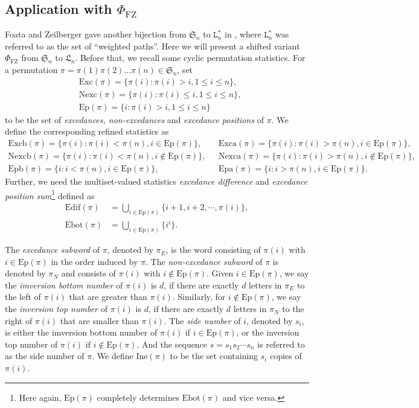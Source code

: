 \documentclass[12pt]{amsart}
\numberwithin{equation}{section}
\theoremstyle{plain}
\theoremstyle{definition}
\def\FZ{\mathrm{FZ}}
\def\SS{\mathfrak{S}}
\def\LH{\mathfrak{L}}
\def\Edif{\mathrm{Edif}}
\def\Excp{\mathrm{Ep}}
\def\Exc{\mathrm{Exc}}
\def\Nexc{\mathrm{Nexc}}
\def\Excpb{\mathrm{Epb}}
\def\Excpa{\mathrm{Epa}}
\def\Nexcb{\mathrm{Nexcb}}
\def\Nexca{\mathrm{Nexca}}
\def\Excb{\mathrm{Excb}}
\def\Exca{\mathrm{Exca}}
\def\Ine{\mathrm{Ine}}
\def\Ebot{\mathrm{Ebot}}
\begin{document}
\subsection{Application with \texorpdfstring{$\Phi_{\FZ}$}{Foata-Zeilberger's bijection}}\label{subsec:FZ}

Foata and Zeilberger gave another bijection
from $\SS_n$ to $\mathtt{L}_n^*$ in \cite{FZ90}, where $\mathtt{L}_n^*$ was referred to as the set of ``weighted paths''. Here we will present a shifted variant $\Phi_{\FZ}$ from $\SS_n$ to $\LH_n$.
Before that, we recall some cyclic permutation statistics. For a permutation
$\pi=\pi(1)\pi(2)\ldots \pi(n) \in \SS_n$, set
\begin{align*}
   &\Exc(\pi) =\{\pi(i) : \pi(i) > i, 1 \leq i \leq n\},  \\[3pt]
  &\Nexc(\pi) =\{\pi(i) : \pi(i) \leq i, 1 \leq i \leq n\},  \\[3pt]
   &\Excp(\pi)  =\{i: \pi(i) > i, 1 \leq i \leq n\}
\end{align*}
to be the set of {\em excedances, non-excedances} and {\em excedance positions} of $\pi$. We define the corresponding refined statistics as
\begin{align*}
  \Excb(\pi)=\{\pi(i) : \pi(i) <\pi(n), i \in \Excp(\pi)\}, &\,\,\,\, \Exca(\pi)=\{\pi(i) : \pi(i) >\pi(n), i \in \Excp(\pi)\}, \\[3pt]
  \Nexcb(\pi)=\{\pi(i) : \pi(i)<\pi(n), i \notin \Excp(\pi)\}, & \,\,\,\,\Nexca(\pi)=\{\pi(i) : \pi(i) >\pi(n), i \notin \Excp(\pi)\}, \\[3pt]
  \Excpb(\pi)=\{i : i <\pi(n), i \in \Excp(\pi)\}, &\,\,\,\, \Excpa(\pi)=\{i : i >\pi(n), i \in \Excp(\pi)\}.
\end{align*}
Further, we need the multiset-valued statistics {\em excedance difference} and {\em excedance position sum}\footnote{Here again, $\Excp(\pi)$ completely determines $\Ebot(\pi)$ and vice versa.} defined as
\begin{align*}
\Edif(\pi) &=\bigcup_{i \in \Excp(\pi)}\{i+1,i+2, \cdots, \pi(i)\},\\
\Ebot(\pi) &=\bigcup_{i \in \Excp(\pi)}\{i^{i}\}.
\end{align*}

The {\em excedance subword} of $\pi$, denoted by $\pi_E$,
is the word consisting of $\pi(i)$ with $i \in \Excp(\pi)$ in the order
induced by $\pi$. The {\em non-excedance subword} of $\pi$ is denoted
by $\pi_N$ and consists of $\pi(i)$ with $i \notin \Excp(\pi)$.
Given $i \in \Excp(\pi)$, we say the {\em imversion bottom number}
of $\pi(i)$ is $d$, if there are  exactly $d$ letters in $\pi_E$ to the left of $\pi(i)$ that are greater than $\pi(i)$. Similarly, for $i \notin \Excp(\pi)$, we say the {\em inversion top number} of $\pi(i)$ is $d$, if there are exactly $d$ letters in $\pi_N$ to the
right of $\pi(i)$ that are smaller than $\pi(i)$. The {\em side number} of $i$, denoted by $s_i$, is either the imversion bottom number
of $\pi(i)$ if $i \in \Excp(\pi)$, or the inversion top number of $\pi(i)$ if $i \notin \Excp(\pi)$. And the sequence $s=s_1 s_2 \cdots s_n$ is referred to as the side number of $\pi$. We define $\Ine(\pi)$ to be the set containing $s_i$ copies of $\pi(i)$.
\end{document}
